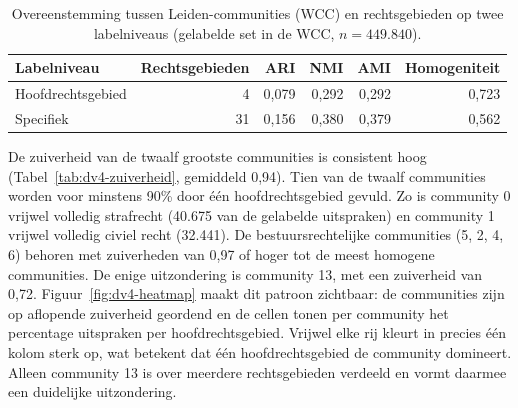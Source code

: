 \documentclass[a4paper, 12pt]{report}
\begin{document}
\begin{table}[H]
  \centering
  \caption{Overeenstemming tussen Leiden-communities (WCC) en rechtsgebieden op twee labelniveaus (gelabelde set in de WCC, $n = 449.840$).}
  \label{tab:dv4-maten}
  \begin{tabular}{lrrrrr}
    \toprule
    Labelniveau & Rechtsgebieden & ARI & NMI & AMI & Homogeniteit \\
    \midrule
    Hoofdrechtsgebied & 4  & 0,079 & 0,292 & 0,292 & 0,723 \\
    Specifiek         & 31 & 0,156 & 0,380 & 0,379 & 0,562 \\
    \bottomrule
  \end{tabular}
\end{table}

De zuiverheid van de twaalf grootste communities is consistent hoog (Tabel~\ref{tab:dv4-zuiverheid}, gemiddeld 0,94). Tien van de twaalf communities worden voor minstens 90\% door één hoofdrechtsgebied gevuld. Zo is community 0 vrijwel volledig strafrecht (40.675 van de gelabelde uitspraken) en community 1 vrijwel volledig civiel recht (32.441). De bestuursrechtelijke communities (5, 2, 4, 6) behoren met zuiverheden van 0,97 of hoger tot de meest homogene communities. De enige uitzondering is community 13, met een zuiverheid van 0,72. Figuur~\ref{fig:dv4-heatmap} maakt dit patroon zichtbaar: de communities zijn op aflopende zuiverheid geordend en de cellen tonen per community het percentage uitspraken per hoofdrechtsgebied. Vrijwel elke rij kleurt in precies één kolom sterk op, wat betekent dat één hoofdrechtsgebied de community domineert. Alleen community 13 is over meerdere rechtsgebieden verdeeld en vormt daarmee een duidelijke uitzondering.
\end{document}
